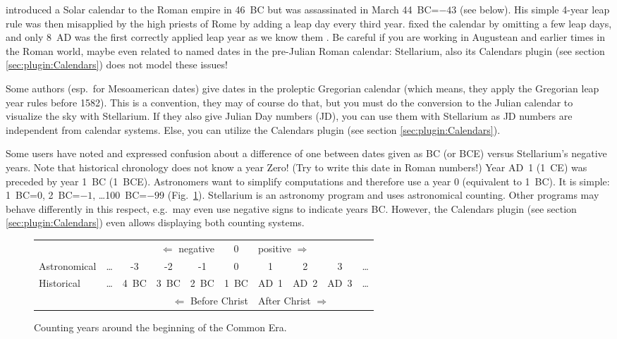  introduced a Solar calendar to the Roman empire
in 46~BC but was assassinated in March 44~BC=$-43$ (see below).  His
simple 4-year leap rule was then misapplied by the high priests of
Rome by adding a leap day every third year.   fixed the
calendar by omitting a few leap days, and only 8~AD was the first
correctly applied leap year as we know them \citep[\S186,
  \S189]{Ginzel:ChronologieII}. Be careful if you are working in
Augustean and earlier times in the Roman world, maybe even related to
named dates in the pre-Julian Roman calendar: Stellarium, also its
Calendars plugin (see section \ref{sec:plugin:Calendars}) does not
model these issues!


Some authors (esp.\ for Mesoamerican dates) give dates in the
proleptic Gregorian calendar (which means, they apply the Gregorian
leap year rules before 1582). This is a convention, they may of course
do that, but you must do the conversion to the Julian calendar to
visualize the sky with Stellarium.  If they also give Julian Day
numbers (JD), you can use them with Stellarium as JD numbers are
independent from calendar systems. Else, you can utilize the Calendars
plugin (see section \ref{sec:plugin:Calendars}).

Some users have noted and expressed confusion about a difference of one between dates given as BC (or BCE) versus
Stellarium's negative years.  
Note that historical chronology does not know a year Zero! (Try to write this date in Roman numbers!)  
Year AD~1 (1~CE) was preceded by year 1~BC (1~BCE). 
Astronomers want to simplify computations and therefore use a year $0$ (equivalent to 1~BC). 
It is simple: 1~BC=$0$, 2~BC=$-1$, \ldots 100~BC=$-99$ (Fig.~\ref{fig:Accuracy:Calendar}). 
Stellarium is an astronomy program and uses astronomical counting. 
Other programs may behave differently in this respect, 
e.g.\ may even use negative signs to indicate years BC. 
However, the Calendars plugin (see section \ref{sec:plugin:Calendars}) 
even allows displaying both counting systems.

\begin{figure}[htb]\centering\small
  \begin{tabular}{l|ccccccccc}
    & \multicolumn{4}{r}{$\Longleftarrow$ negative}&
    \multicolumn{1}{c}{0}&
    \multicolumn{4}{l}{positive $\Longrightarrow$}\\
    Astronomical & \ldots & -3   & -2   & -1   & 0                        & 1    & 2    & 3    & \ldots\\\hline
    Historical   & \ldots & 4~BC & 3~BC & 2~BC &\multicolumn{1}{c||}{1~BC}& AD~1 & AD~2 & AD~3 & \ldots\\
    & \multicolumn{5}{r||}{$\Longleftarrow$ Before Christ}&
      \multicolumn{4}{l}{After Christ $\Longrightarrow$}
  \end{tabular}
  \caption{Counting years around the beginning of the Common Era.}
  \label{fig:Accuracy:Calendar}
\end{figure}
  

